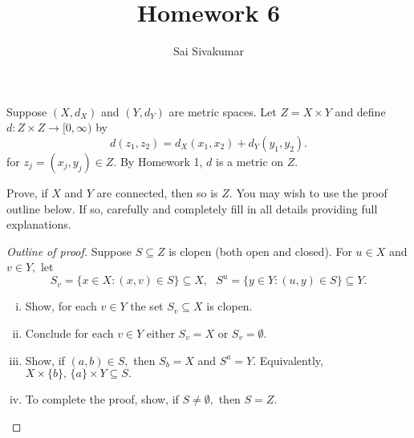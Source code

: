 \documentclass[12pt]{amsart}
\title{Homework 6}
\author{Sai Sivakumar}
\begin{document}
\maketitle

Suppose $(X,d_X)$ and $(Y,d_Y)$ are metric spaces.
 Let $Z=X\times Y$ and define $d:Z\times Z\to [0,\infty)$ by
\[
  d(z_1,z_2)= d_X(x_1,x_2)+d_Y(y_1,y_2).
\]
for  $z_j=(x_j,y_j) \in Z.$ By Homework 1, 
 $d$ is a metric on $Z.$  

\bigskip

Prove, if   $X$ and $Y$ are connected,  then so is $Z.$
 You may wish to use the proof  outline  below. If so,
 carefully and completely fill in all details providing
 full explanations.

\begin{proof}[Outline of proof]  Suppose $S\subseteq Z$ is clopen (both open and closed).   
 For $u\in X$ and $v\in Y,$ let
\[
  S_v =\{x\in X: (x,v)\in S\}\subseteq X, \ \ \ S^u=\{y\in Y: (u,y)\in S\}\subseteq Y.
\]
\begin{enumerate}[(i)] \itemsep=8pt
 \item Show, for each  $v\in Y$ the set $S_v\subseteq X$ is clopen. 
 \item Conclude for each  $v\in Y$ either $S_v=X$  or $S_v=\emptyset.$
 \item Show,  if $(a,b)\in S,$ then $S_b=X$ and $S^a=Y.$ Equivalently, 
  $X\times\{b\},\, \{a\}\times Y\subseteq S.$
 \item To complete the proof, show, if  $S\ne \emptyset,$  then $S=Z.$
\end{enumerate}
\end{proof}
\end{document}
